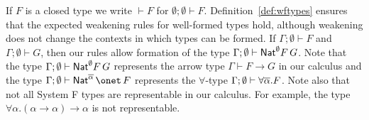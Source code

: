 \documentclass[runningheads]{llncs}
\begin{document}
If $F$ is a closed type we write $\vdash F$ for $\emptyset;\emptyset
\vdash F$.  Definition~\ref{def:wftypes} ensures that the expected
weakening rules for well-formed types hold, although weakening does
not change the contexts in which types can be formed. If
$\Gamma;\emptyset \vdash F$ and $\Gamma;\emptyset \vdash G$, then our
rules allow formation of the type $\Gamma;\emptyset \vdash
\mathsf{Nat}^\emptyset F \,G$.
Note that the type $\Gamma;\emptyset \vdash \mathsf{Nat}^\emptyset F \,G$
represents the arrow type $\Gamma \vdash F \to G$ in our calculus and
the type $\Gamma; \emptyset \vdash \Nat^{\ol\alpha} \,\onet \,F$
represents the $\forall$-type $\Gamma; \emptyset \vdash \forall
\overline{\alpha} . F$.  Note also that
not all System F types are 
representable in our calculus. For example, the type $\forall
\alpha. (\alpha \to \alpha) \to \alpha$ is not representable.
%
\end{document}
